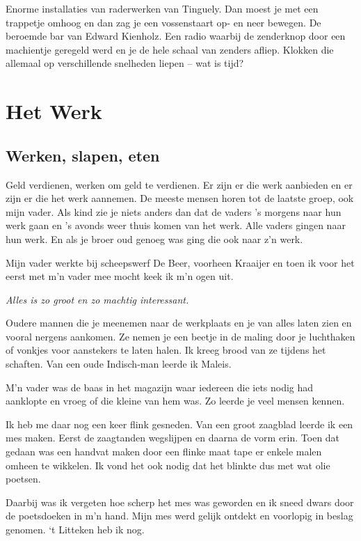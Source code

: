 \documentclass[10pt,twoside,openright]{memoir}
\begin{document}
Enorme installaties van raderwerken van Tinguely. Dan moest je met een trappetje omhoog en dan zag je een vossenstaart op- en neer bewegen. De beroemde bar van Edward Kienholz. Een radio waarbij de zenderknop door een machientje geregeld werd en je de hele schaal van zenders afliep. Klokken die allemaal op verschillende snelheden liepen – wat is tijd? 

\part{Het Werk}

\chapter{Werken, slapen, eten} %
\label{cha:werkenslapen}

Geld verdienen, werken om geld te verdienen. Er zijn er die werk aanbieden en er zijn er die het werk aannemen. De meeste mensen horen tot de laatste groep, ook mijn vader. Als kind zie je niets anders dan dat de vaders ’s morgens naar hun werk gaan en ’s avonds weer thuis komen van het werk. Alle vaders gingen naar hun werk. En als je broer oud genoeg was ging die ook naar z’n werk.

Mijn vader werkte bij scheepswerf De Beer, voorheen Kraaijer en toen ik voor het eerst met m’n vader mee mocht keek ik m’n ogen uit.

\emph{Alles is zo groot en zo machtig interessant. }

Oudere mannen die je meenemen naar de werkplaats en je van alles laten zien en vooral nergens aankomen. Ze nemen je een beetje in de maling door je luchthaken of vonkjes voor aanstekers te laten halen. Ik kreeg brood van ze tijdens het schaften. Van een oude Indisch-man leerde ik Maleis. 

M’n vader was de baas in het magazijn waar iedereen die iets nodig had aanklopte en vroeg of die kleine van hem was. Zo leerde je veel mensen kennen. 

Ik heb me daar nog een keer flink gesneden. Van een groot zaagblad leerde ik een mes maken. Eerst de zaagtanden wegslijpen en daarna de vorm erin. Toen dat gedaan was een handvat maken door een flinke maat tape er enkele malen omheen te wikkelen. Ik vond het ook nodig dat het blinkte dus met wat olie poetsen. 

Daarbij was ik vergeten hoe scherp het mes was geworden en ik sneed dwars door de poetsdoeken in m’n hand. Mijn mes werd gelijk ontdekt en voorlopig in beslag genomen. ‘t Litteken heb ik nog.
\end{document}
